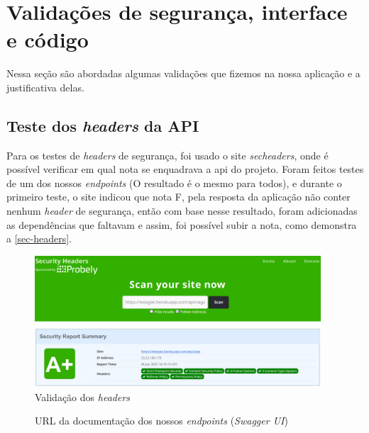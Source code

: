\section{Validações de segurança, interface e código}
Nessa seção são abordadas algumas validações que fizemos na nossa aplicação e a justificativa delas.

\subsection{Teste dos \textit{headers} da API}
Para os testes de \textit{headers} de segurança, foi usado o site \textit{\gls{secheaders}}, onde é possível verificar em qual nota se enquadrava a \ac{api} do projeto. Foram feitos testes de um dos nossos \textit{\glspl{endpoint}} (O resultado é o mesmo para todos), e durante o primeiro teste, o site indicou que nota F, pela resposta da aplicação não conter nenhum \textit{header} de segurança, então com base nesse resultado, foram adicionadas as dependências que faltavam e assim, foi possível subir a nota, como demonstra a \autoref{sec-headers}.

\begin{figure}[H]
	\centering
	\caption{\label{sec-headers}Validação dos \textit{headers}}
	\includegraphics[width=0.95\textwidth]{../imagens/web-tests/grade-security-headers.png}
\end{figure}

\begin{figure}[htb]
	\caption{\label{qr-url-swagger}URL da documentação dos nossos \textit{\glspl{endpoint}} (\textit{Swagger UI})}
	\begin{center}
	\end{center}
\end{figure}

